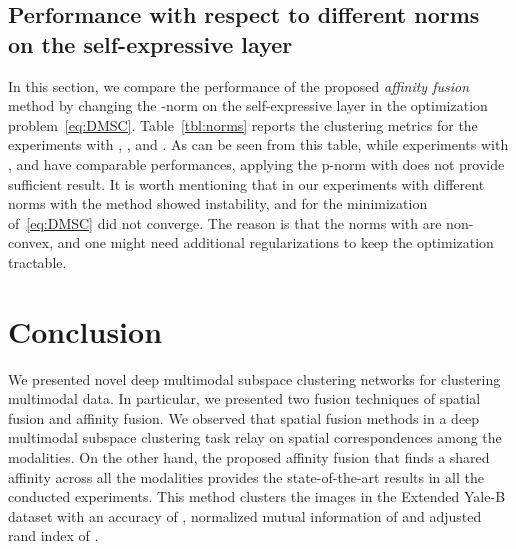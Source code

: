 \documentclass[journal]{IEEEtran}
\begin{document}
\subsection{Performance with respect to different norms on the self-expressive layer}
In this section, we compare the performance of the proposed \emph{affinity fusion} method by changing the  -norm on the self-expressive layer in the optimization problem~\eqref{eq:DMSC}.   Table~\ref{tbl:norms} reports the clustering metrics for the experiments with , ,  and .   As can be seen from this table, while experiments with ,  and  have comparable performances, applying the p-norm with  does not provide sufficient result.  It is worth mentioning that in our experiments with different norms with  the method showed instability, and for  the minimization of~\eqref{eq:DMSC} did not converge.  The reason is that the norms with  are non-convex, and one might need additional regularizations to keep the optimization tractable. 

\begin{table}[t]
\begin{center}
\caption{Analysis of different regularization norms on the self-expressive layer.  Our experiments with  did not converged. The results are 5-fold average. We use boldface for the top performer.} \label{tbl:norms}
\end{center}
\end{table}


\section{Conclusion}\label{sec:con}
We presented novel deep multimodal subspace clustering networks for clustering multimodal data.  In particular, we presented two fusion techniques of spatial fusion and affinity fusion.   We observed that spatial fusion methods in a deep multimodal subspace clustering task relay on spatial correspondences among the modalities.  On the other hand, the proposed affinity fusion that finds a shared affinity across all the modalities provides the state-of-the-art results in all the conducted experiments.  This method clusters the images in the Extended Yale-B dataset with an accuracy  of , normalized mutual information of  and adjusted rand index of .  
\end{document}
